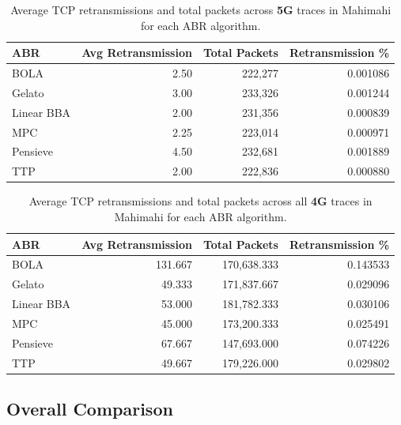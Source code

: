 \begin{table}[t!]
\centering
\small
\caption{Average TCP retransmissions and total packets across \textbf{5G} traces in Mahimahi for each ABR algorithm.}
\label{tab:tcp-5g-mahimahi}
\begin{tabular}{@{\hskip 6pt}l@{\hskip 6pt}r@{\hskip 6pt}r@{\hskip 6pt}r@{\hskip 6pt}}
\toprule
\textbf{ABR} & \textbf{Avg Retransmission} & \textbf{Total Packets} & \textbf{Retransmission \%} \\
\midrule
BOLA      & 2.50   & 222{,}277   & 0.001086 \\
Gelato    & 3.00   & 233{,}326   & 0.001244 \\
Linear BBA & 2.00   & 231{,}356   & 0.000839 \\
MPC       & 2.25   & 223{,}014   & 0.000971 \\
Pensieve  & 4.50  & 232{,}681   & 0.001889 \\
TTP       & 2.00   & 222{,}836   & 0.000880 \\
\bottomrule
\end{tabular}
\end{table}

\begin{table}[t!]
\centering
\small
\caption{Average TCP retransmissions and total packets across all \textbf{4G} traces in Mahimahi for each ABR algorithm.}
\label{tab:tcp-4g}
\begin{tabular}{@{\hskip 6pt}l@{\hskip 6pt}r@{\hskip 6pt}r@{\hskip 6pt}r@{\hskip 6pt}}
\toprule
\textbf{ABR} & \textbf{Avg Retransmission} & \textbf{Total Packets} & \textbf{Retransmission \%} \\
\midrule
BOLA      & 131.667  & 170{,}638.333   & 0.143533 \\
Gelato    & 49.333   & 171{,}837.667   & 0.029096 \\
Linear BBA & 53.000   & 181{,}782.333   & 0.030106 \\
MPC       & 45.000   & 173{,}200.333   & 0.025491 \\
Pensieve  & 67.667   & 147{,}693.000   & 0.074226 \\
TTP       & 49.667   & 179{,}226.000   & 0.029802 \\
\bottomrule
\end{tabular}
\end{table}

\vspace{50pt}
\subsection{Overall Comparison}


